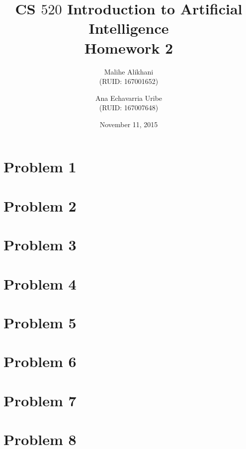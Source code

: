 \documentclass{article}
\begin{document}
\title{CS $520$ Introduction to Artificial Intelligence \\ Homework 2 }
\date{November 11, 2015}
\author{Malihe Alikhani \\ \small{(RUID: 167001652)} \and Ana Echavarria Uribe \\ \small{(RUID: 167007648)}}

\maketitle

\section*{Problem 1}



\section*{Problem 2}


\section*{Problem 3}


\section*{Problem 4}




\section*{Problem 5}

\section*{Problem 6}


\section*{Problem 7}




\section*{Problem 8}
\end{document}
